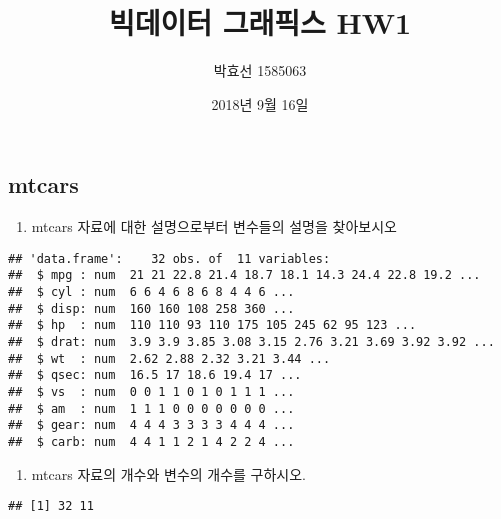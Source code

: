 \documentclass[]{article}
\title{빅데이터 그래픽스 HW1}
\author{박효선 1585063}
\date{2018년 9월 16일}
\newenvironment{Shaded}{\begin{snugshade}}{\end{snugshade}}
\newcommand{\KeywordTok}[1]{\textcolor[rgb]{0.13,0.29,0.53}{\textbf{#1}}}
\newcommand{\CommentTok}[1]{\textcolor[rgb]{0.56,0.35,0.01}{\textit{#1}}}
\newcommand{\NormalTok}[1]{#1}
\providecommand{\tightlist}{%
  \setlength{\itemsep}{0pt}\setlength{\parskip}{0pt}}
\begin{document}
\maketitle

\subsection{mtcars}\label{mtcars}

\begin{enumerate}
\def\labelenumi{\arabic{enumi})}
\tightlist
\item
  mtcars 자료에 대한 설명으로부터 변수들의 설명을 찾아보시오
\end{enumerate}

\begin{Shaded}
\end{Shaded}

\begin{verbatim}
## 'data.frame':    32 obs. of  11 variables:
##  $ mpg : num  21 21 22.8 21.4 18.7 18.1 14.3 24.4 22.8 19.2 ...
##  $ cyl : num  6 6 4 6 8 6 8 4 4 6 ...
##  $ disp: num  160 160 108 258 360 ...
##  $ hp  : num  110 110 93 110 175 105 245 62 95 123 ...
##  $ drat: num  3.9 3.9 3.85 3.08 3.15 2.76 3.21 3.69 3.92 3.92 ...
##  $ wt  : num  2.62 2.88 2.32 3.21 3.44 ...
##  $ qsec: num  16.5 17 18.6 19.4 17 ...
##  $ vs  : num  0 0 1 1 0 1 0 1 1 1 ...
##  $ am  : num  1 1 1 0 0 0 0 0 0 0 ...
##  $ gear: num  4 4 4 3 3 3 3 4 4 4 ...
##  $ carb: num  4 4 1 1 2 1 4 2 2 4 ...
\end{verbatim}

\begin{enumerate}
\def\labelenumi{\arabic{enumi})}
\setcounter{enumi}{1}
\tightlist
\item
  mtcars 자료의 개수와 변수의 개수를 구하시오.
\end{enumerate}

\begin{Shaded}
\end{Shaded}

\begin{verbatim}
## [1] 32 11
\end{verbatim}
\end{document}

